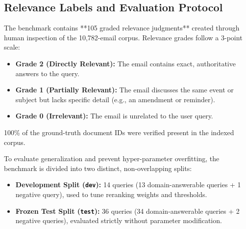 \documentclass[11pt,a4paper]{article}
\begin{document}
\subsection{Relevance Labels and Evaluation Protocol}
The benchmark contains **105 graded relevance judgments** created through human inspection of the 10,782-email corpus. Relevance grades follow a 3-point scale:
\begin{itemize}
    \item \textbf{Grade 2 (Directly Relevant):} The email contains exact, authoritative answers to the query.
    \item \textbf{Grade 1 (Partially Relevant):} The email discusses the same event or subject but lacks specific detail (e.g., an amendment or reminder).
    \item \textbf{Grade 0 (Irrelevant):} The email is unrelated to the user query.
\end{itemize}
100\% of the ground-truth document IDs were verified present in the indexed corpus.

To evaluate generalization and prevent hyper-parameter overfitting, the benchmark is divided into two distinct, non-overlapping splits:
\begin{itemize}
    \item \textbf{Development Split (\texttt{dev}):} 14 queries (13 domain-answerable queries + 1 negative query), used to tune reranking weights and thresholds.
    \item \textbf{Frozen Test Split (\texttt{test}):} 36 queries (34 domain-answerable queries + 2 negative queries), evaluated strictly without parameter modification.
\end{itemize}
\end{document}

